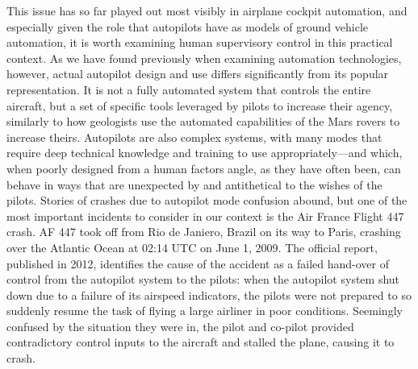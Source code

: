 This issue has so far played out most visibly in airplane cockpit
automation, and especially given the role that autopilots have as
models of ground vehicle automation, it is worth examining human
supervisory control in this practical
context. As we have found previously when examining automation
technologies, however, actual autopilot design and use differs 
significantly from its popular representation. It is not a fully automated
system that controls the entire aircraft, but a set of specific tools
leveraged by pilots to increase their agency, similarly to how
geologists use the automated capabilities of the Mars rovers to
increase theirs. Autopilots are also complex systems, with many modes
that require deep technical knowledge and training to use
appropriately\cite{???}---and which, when poorly designed from a human factors
angle, as they have often been, can behave in ways that are unexpected
by and antithetical to the wishes of the pilots. Stories of crashes
due to autopilot mode confusion abound, but one of the most important
incidents to consider in our context is the Air France Flight 447 crash. AF
447 took off from Rio de Janiero, Brazil on its way to Paris, crashing
over the Atlantic Ocean at 02:14 UTC on June 1, 2009. The official
report, published in 2012, identifies the cause of the accident as a
failed hand-over of control from the autopilot system to the pilots:
when the autopilot system shut down due to a failure of its airspeed
indicators, the pilots were not prepared to so suddenly resume the
task of flying a large airliner in poor conditions.\cite{BEA}
Seemingly confused by the situation they were in, the pilot and
co-pilot provided contradictory control inputs to the aircraft and
stalled the plane, causing it to crash. 

